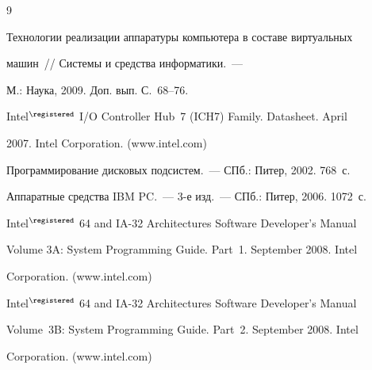 {\small\frenchspacing


{%




\begin{thebibliography}{9}









Технологии реализации аппаратуры компьютера в составе виртуальных 


машин~/\!\!/ Системы и средства информатики.~--- 


М.: Наука, 2009.  Доп. вып. С.~68--76.







Intel$^\registered$ I/O Controller Hub~7 (ICH7) Family. Datasheet. April 


2007. Intel Corporation. ({\sf www.intel.com})









Программирование дисковых подсистем.~--- СПб.: Питер, 2002.  768~с.









Аппаратные средства IBM PC.~--- 3-е изд.~--- СПб.: Питер, 2006. 1072~с.







Intel$^\registered$ 64 and IA-32 Architectures Software Developer's Manual 


Volume 3A: System Programming Guide. Part~1. September 2008. Intel 


Corporation. ({\sf www.intel.com})





\label{end\stat}







Intel$^\registered$ 64 and IA-32 Architectures Software Developer's Manual 


Volume~3B: System Programming Guide. Part~2. September 2008. Intel 


Corporation. ({\sf www.intel.com})





 \end{thebibliography}


}


}











